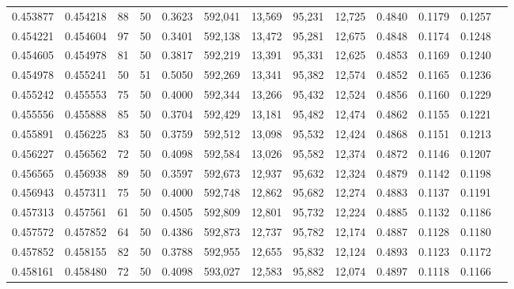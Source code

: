 \begin{tabular}{rrrrrrrrrrrrr}
0.453877 & 0.454218 &    88 &  50 &                                     0.3623 & 592,041 &  13,569 &  95,231 &  12,725 & 0.4840 & 0.1179 & 0.1257 \\
0.454221 & 0.454604 &    97 &  50 &                                     0.3401 & 592,138 &  13,472 &  95,281 &  12,675 & 0.4848 & 0.1174 & 0.1248 \\
0.454605 & 0.454978 &    81 &  50 &                                     0.3817 & 592,219 &  13,391 &  95,331 &  12,625 & 0.4853 & 0.1169 & 0.1240 \\
0.454978 & 0.455241 &    50 &  51 &                                     0.5050 & 592,269 &  13,341 &  95,382 &  12,574 & 0.4852 & 0.1165 & 0.1236 \\
0.455242 & 0.455553 &    75 &  50 &                                     0.4000 & 592,344 &  13,266 &  95,432 &  12,524 & 0.4856 & 0.1160 & 0.1229 \\
0.455556 & 0.455888 &    85 &  50 &                                     0.3704 & 592,429 &  13,181 &  95,482 &  12,474 & 0.4862 & 0.1155 & 0.1221 \\
0.455891 & 0.456225 &    83 &  50 &                                     0.3759 & 592,512 &  13,098 &  95,532 &  12,424 & 0.4868 & 0.1151 & 0.1213 \\
0.456227 & 0.456562 &    72 &  50 &                                     0.4098 & 592,584 &  13,026 &  95,582 &  12,374 & 0.4872 & 0.1146 & 0.1207 \\
0.456565 & 0.456938 &    89 &  50 &                                     0.3597 & 592,673 &  12,937 &  95,632 &  12,324 & 0.4879 & 0.1142 & 0.1198 \\
0.456943 & 0.457311 &    75 &  50 &                                     0.4000 & 592,748 &  12,862 &  95,682 &  12,274 & 0.4883 & 0.1137 & 0.1191 \\
0.457313 & 0.457561 &    61 &  50 &                                     0.4505 & 592,809 &  12,801 &  95,732 &  12,224 & 0.4885 & 0.1132 & 0.1186 \\
0.457572 & 0.457852 &    64 &  50 &                                     0.4386 & 592,873 &  12,737 &  95,782 &  12,174 & 0.4887 & 0.1128 & 0.1180 \\
0.457852 & 0.458155 &    82 &  50 &                                     0.3788 & 592,955 &  12,655 &  95,832 &  12,124 & 0.4893 & 0.1123 & 0.1172 \\
0.458161 & 0.458480 &    72 &  50 &                                     0.4098 & 593,027 &  12,583 &  95,882 &  12,074 & 0.4897 & 0.1118 & 0.1166 \\

\end{tabular}
